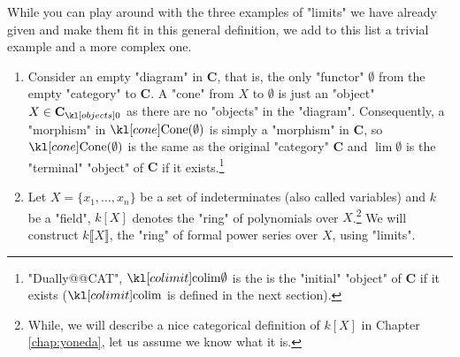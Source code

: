 \documentclass[main.tex]{subfiles}
\begin{document}
\begin{exmps}
    While you can play around with the three examples of "limits" we have already given and make them fit in this general definition, we add to this list a trivial example and a more complex one.
    \begin{enumerate}
        \item Consider an empty "diagram" in $\mathbf{C}$, that is, the only "functor" $\emptyset$ from the empty "category" to $\mathbf{C}$. A "cone" from $X$ to $\emptyset$ is just an "object" $X \in \obj{\mathbf{C}}$ as there are no "objects" in the "diagram". Consequently, a "morphism" in $\cone(\emptyset)$ is simply a "morphism" in $\mathbf{C}$, so $\cone(\emptyset)$ is the same as the original "category" $\mathbf{C}$ and $\lim \emptyset$ is the "terminal" "object" of $\mathbf{C}$ if it exists.\footnote{"Dually@@CAT", $\colim \emptyset$ is the is the "initial" "object" of $\mathbf{C}$ if it exists ($\colim$ is defined in the next section).}
        \item Let $X = \{x_1, \dots, x_n\}$ be a set of indeterminates (also called variables) and $k$ be a "field", $k[X]$ denotes the "ring" of polynomials over $X$.\footnote{While, we will describe a nice categorical definition of $k[X]$ in Chapter \ref{chap:yoneda}, let us assume we know what it is.} We will construct $k\llbracket X\rrbracket$, the "ring" of formal power series over $X$, using "limits".
        

\end{enumerate}
\end{exmps}
\end{document}
